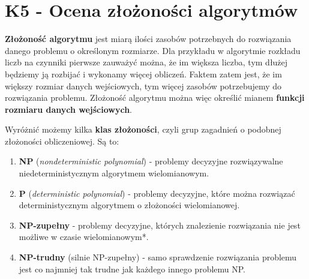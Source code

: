 \section{K5 - Ocena złożoności algorytmów}

\textbf{Złożoność algorytmu} jest miarą ilości zasobów potrzebnych do rozwiązania danego problemu o określonym rozmiarze. Dla przykładu w algorytmie rozkładu liczb na czynniki pierwsze zauważyć można, że im większa liczba, tym dłużej będziemy ją rozbijać i wykonamy więcej obliczeń. Faktem zatem jest, że im większy rozmiar danych wejściowych, tym więcej zasobów potrzebujemy do rozwiązania problemu. Złożoność algorytmu można więc określić mianem \textbf{funkcji rozmiaru danych wejściowych}.

Wyróżnić możemy kilka \textbf{klas złożoności}, czyli grup zagadnień o podobnej złożoności obliczeniowej. Są to:
\begin{enumerate}
	\item \textbf{NP} (\textit{nondeterministic polynomial}) - problemy decyzyjne rozwiązywalne niedeterministycznym algorytmem 
wielomianowym.
	\item \textbf{P} (\textit{deterministic polynomial}) - problemy decyzyjne, które można rozwiązać deterministycznym algorytmem 
o złożoności wielomianowej.
	\item \textbf{NP-zupełny} - problemy decyzyjne, których znalezienie rozwiązania nie jest możliwe w czasie wielomianowym*.
	\item \textbf{NP-trudny} (silnie NP-zupełny) - samo sprawdzenie rozwiązania problemu jest co najmniej tak trudne jak każdego innego problemu NP.
\end{enumerate}

